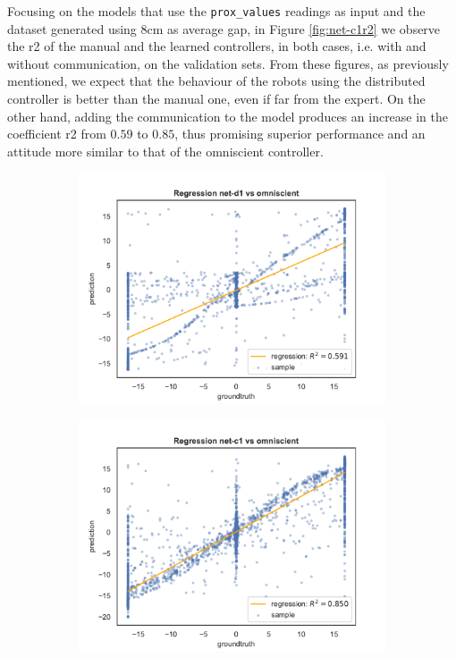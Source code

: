 Focusing on the models that use the \texttt{prox\_values} readings as input and 
the dataset generated using $8$\gls{cm} as average gap, in Figure 
\ref{fig:net-c1r2} we observe the \gls{r2} of the manual and the learned 
controllers, in both cases, i.e. with and without communication, on the validation 
sets.
From these figures, as previously mentioned, we expect that the behaviour of the 
robots using the distributed controller is better than the manual one, even if 
far from the expert. On the other hand, adding the communication to the model 
produces an increase in the coefficient \gls{r2} from $0.59$ to $0.85$, thus 
promising superior performance and an attitude more similar to that of the 
omniscient controller.

\begin{figure}[!htb]
	\begin{center}
		\begin{subfigure}[h]{0.49\textwidth}
			\includegraphics[width=\textwidth]{contents/images/net-d1/regression-net-d1-vs-omniscient}%
		\end{subfigure}
		\hfill\vspace{-0.5cm}
		\begin{subfigure}[h]{0.49\textwidth}
			\includegraphics[width=\textwidth]{contents/images/net-c1/regression-net-c1-vs-omniscient}%

\end{subfigure}
\end{center}
\end{figure}
